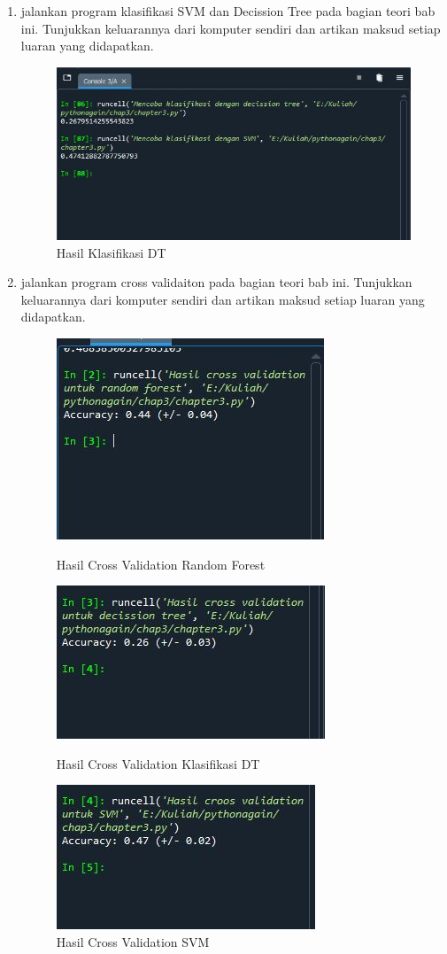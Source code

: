 \begin{enumerate}
\newpage
\item jalankan program klasifikasi SVM dan Decission Tree pada bagian teori bab ini. Tunjukkan keluarannya dari komputer sendiri dan artikan maksud setiap luaran yang didapatkan.
\begin{figure}[!htbp]
    \centering
    \includegraphics[scale=0.5]{figures/chap3SVMdanDT.JPG}
	\caption{Hasil Klasifikasi DT}
\end{figure}

\item jalankan program cross validaiton pada bagian teori bab ini. Tunjukkan keluarannya dari komputer sendiri dan artikan maksud setiap luaran yang didapatkan.
\newpage
\begin{figure}[!htbp]
    \centering
    \includegraphics[scale=0.6]{figures/chap3CVjangRF.JPG}
    \caption{Hasil Cross Validation Random Forest}
    \includegraphics[scale=0.6]{figures/chap3CVjangDT.JPG}
    \caption{Hasil Cross Validation Klasifikasi DT}
    \includegraphics[scale=0.6]{figures/chap3CVjangSVM.JPG}
	\caption{Hasil Cross Validation SVM}
\end{figure}


\end{enumerate}
